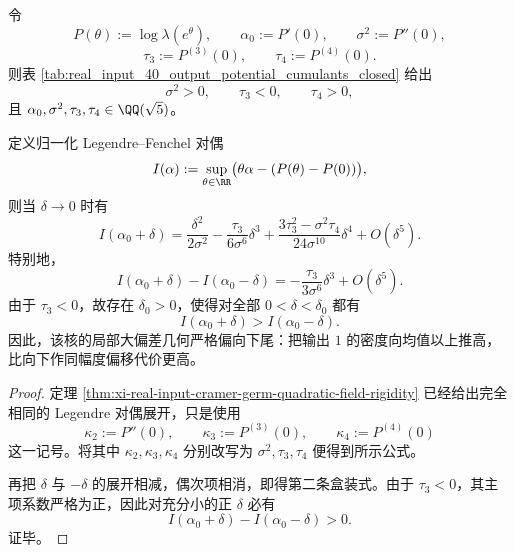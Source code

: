 \begin{theorem}[实输入四十状态核的局部大偏差率函数严格偏向下尾]\label{thm:xi-real-input40-local-rate-strict-downward-asymmetry}
令
\[
P(\theta):=\log\lambda(e^\theta),
\qquad
\alpha_0:=P'(0),
\qquad
\sigma^2:=P''(0),
\]
\[
\tau_3:=P^{(3)}(0),
\qquad
\tau_4:=P^{(4)}(0).
\]
则表 \ref{tab:real_input_40_output_potential_cumulants_closed} 给出
\[
\sigma^2>0,
\qquad
\tau_3<0,
\qquad
\tau_4>0,
\]
且 \(\alpha_0,\sigma^2,\tau_3,\tau_4\in\QQ(\sqrt5)\)。

定义归一化 Legendre--Fenchel 对偶
\[
I(\alpha):=\sup_{\theta\in\RR}\bigl(\theta\alpha-(P(\theta)-P(0))\bigr),
\]
则当 \(\delta\to 0\) 时有
\[
\boxed{\;
I(\alpha_0+\delta)
=
\frac{\delta^2}{2\sigma^2}
-\frac{\tau_3}{6\sigma^6}\delta^3
+\frac{3\tau_3^2-\sigma^2\tau_4}{24\sigma^{10}}\delta^4
+O(\delta^5).\;}
\]
特别地，
\[
\boxed{\;
I(\alpha_0+\delta)-I(\alpha_0-\delta)
=
-\frac{\tau_3}{3\sigma^6}\delta^3
+O(\delta^5).\;}
\]
由于 \(\tau_3<0\)，故存在 \(\delta_0>0\)，使得对全部 \(0<\delta<\delta_0\) 都有
\[
I(\alpha_0+\delta)>I(\alpha_0-\delta).
\]
因此，该核的局部大偏差几何严格偏向下尾：把输出 \(1\) 的密度向均值以上推高，比向下作同幅度偏移代价更高。
\end{theorem}
\begin{proof}
定理 \ref{thm:xi-real-input-cramer-germ-quadratic-field-rigidity} 已经给出完全相同的 Legendre 对偶展开，只是使用
\[
\kappa_2:=P''(0),\qquad \kappa_3:=P^{(3)}(0),\qquad \kappa_4:=P^{(4)}(0)
\]
这一记号。将其中
\(
\kappa_2,\kappa_3,\kappa_4
\)
分别改写为
\(
\sigma^2,\tau_3,\tau_4
\)
便得到所示公式。

再把 \(\delta\) 与 \(-\delta\) 的展开相减，偶次项相消，即得第二条盒装式。由于 \(\tau_3<0\)，其主项系数严格为正，因此对充分小的正 \(\delta\) 必有
\[
I(\alpha_0+\delta)-I(\alpha_0-\delta)>0.
\]
证毕。
\end{proof}

